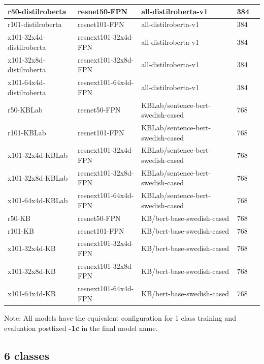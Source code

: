 \documentclass[oneside, english, bibtex]{kththesis}
\begin{document}
\begin{table}[H]
\begin{center}
\begin{adjustbox}{width=1.2\textwidth,center=\textwidth}
{\begin{tabular}{l|l|l|l|p{1.5cm}}
    r50-distilroberta & resnet50-FPN & all-distilroberta-v1 & 384 \\     \hline
    r101-distilroberta & resnet101-FPN & all-distilroberta-v1 & 384 \\     \hline
    x101-32x4d-distilroberta & resnext101-32x4d-FPN & all-distilroberta-v1 & 384 \\     \hline
    x101-32x8d-distilroberta & resnext101-32x8d-FPN & all-distilroberta-v1 & 384 \\     \hline
    x101-64x4d-distilroberta & resnext101-64x4d-FPN & all-distilroberta-v1 & 384 \\     \hline

    r50-KBLab & resnet50-FPN & KBLab/sentence-bert-swedish-cased & 768 \\     \hline
    r101-KBLab & resnet101-FPN & KBLab/sentence-bert-swedish-cased & 768 \\     \hline
    x101-32x4d-KBLab & resnext101-32x4d-FPN & KBLab/sentence-bert-swedish-cased & 768 \\     \hline
    x101-32x8d-KBLab & resnext101-32x8d-FPN & KBLab/sentence-bert-swedish-cased & 768 \\     \hline
    x101-64x4d-KBLab & resnext101-64x4d-FPN & KBLab/sentence-bert-swedish-cased & 768 \\     \hline

    r50-KB & resnet50-FPN & KB/bert-base-swedish-cased & 768 \\     \hline
    r101-KB & resnet101-FPN & KB/bert-base-swedish-cased & 768 \\     \hline
    x101-32x4d-KB & resnext101-32x4d-FPN & KB/bert-base-swedish-cased & 768 \\     \hline
    x101-32x8d-KB & resnext101-32x8d-FPN & KB/bert-base-swedish-cased & 768 \\     \hline
    x101-64x4d-KB & resnext101-64x4d-FPN & KB/bert-base-swedish-cased & 768 \\     \hline
    \end{tabular}
    }
    \end{adjustbox} 
  \end{center}
\begin{center}
Note: All models have the equivalent configuration for 1 class training and evaluation postfixed \textbf{-1c} in the final model name.
\end{center}
\end{table}


\clearpage

\subsection{6 classes}
\end{document}
